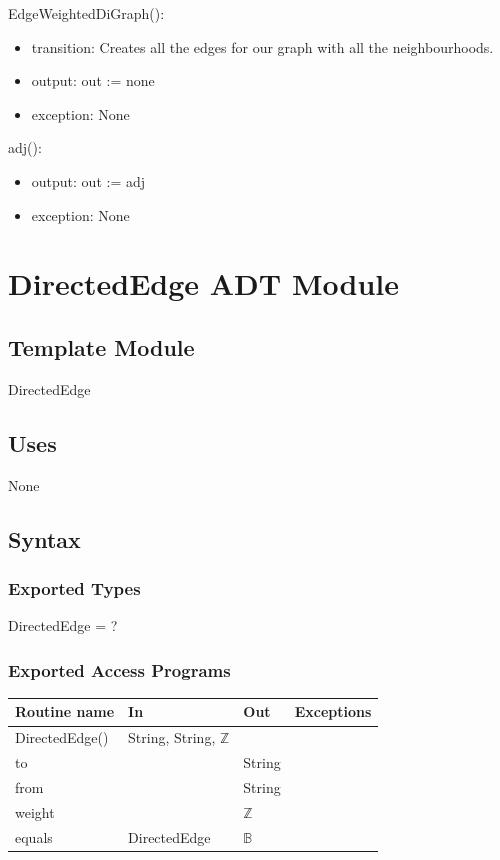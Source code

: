 \documentclass[12pt]{article}
\begin{document}
EdgeWeightedDiGraph():
\begin{itemize}
\item transition: Creates all the edges for our graph with all the neighbourhoods.
\item output: out := none
\item exception: None
\end{itemize}

adj():
\begin{itemize}
\item output: out := adj
\item exception: None
\end{itemize}

\newpage

\section* {DirectedEdge ADT Module}

\subsection*{Template Module}

DirectedEdge

\subsection* {Uses}

None

\subsection* {Syntax}

\subsubsection* {Exported Types}

DirectedEdge = ?

\subsubsection* {Exported Access Programs}

\begin{tabular}{| l | l | l | l |}
\hline
\textbf{Routine name} & \textbf{In} & \textbf{Out} & \textbf{Exceptions}\\
\hline
DirectedEdge() & String, String, $\mathbb{Z}$ & ~ & ~\\
\hline
to & ~ & String & ~\\
\hline
from & ~ & String & ~\\
\hline
weight & ~ & $\mathbb{Z}$ & ~\\
\hline
equals & DirectedEdge & $\mathbb{B}$ & ~\\
\hline
\end{tabular}
\end{document}
